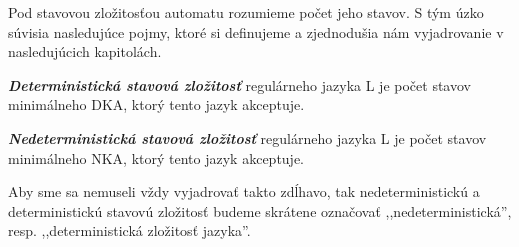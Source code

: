 Pod stavovou zložitosťou automatu rozumieme počet jeho stavov. S tým úzko súvisia nasledujúce pojmy, ktoré si definujeme a zjednodušia nám vyjadrovanie v nasledujúcich kapitolách.

\begin{defn}{\textbf {\textit {Deterministická stavová zložitosť}}} regulárneho jazyka L je počet stavov minimálneho DKA, ktorý tento jazyk akceptuje.
\end{defn}

\begin{defn}{\textbf {\textit {Nedeterministická stavová zložitosť}}}  regulárneho jazyka L je počet stavov minimálneho NKA, ktorý tento jazyk akceptuje.
\end{defn}

Aby sme sa nemuseli vždy vyjadrovať takto zdĺhavo, tak nedeterministickú a deterministickú stavovú zložitosť budeme skrátene označovať ,,nedeterministická'', resp. ,,deterministická zložitosť jazyka''.
